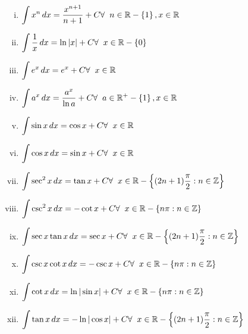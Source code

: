 \documentclass{article}
\begin{document}
\begin{enumerate}[i.]
    \item $\displaystyle\int x^n \, dx=\dfrac{x^{n+1}}{n+1} +C \hfill \forall \hspace{2mm} n \in \mathbb{R}-\left\{1\right\}, x \in \mathbb{R}$
    \item $\displaystyle\int \dfrac{1}{x} \, dx=\ln \abs{x} +C \hfill \forall \hspace{2mm} x \in \mathbb{R}- \left\{0\right\}$
    \item $\displaystyle\int e^x \, dx=e^x +C \hfill \forall \hspace{2mm} x \in \mathbb{R}$
    \item $\displaystyle\int a^x \, dx=\dfrac{a^x}{\ln a} +C \hfill \forall \hspace{2mm} a \in \mathbb{R}^+-\left\{1\right\}, x \in \mathbb{R}$
    \item $\displaystyle\int \sin x \, dx=\cos x +C \hfill \forall \hspace{2mm} x \in \mathbb{R}$
    \item $\displaystyle\int \cos x \, dx=\sin x +C \hfill \forall \hspace{2mm} x \in \mathbb{R}$
    \item $\displaystyle\int \sec^2 x \, dx=\tan x +C \hfill \forall \hspace{2mm} x \in \mathbb{R}-\left\{(2n+1)\dfrac{\pi}{2}:n \in \mathbb{Z}\right\}$
    \item $\displaystyle\int \csc^2 x \, dx=-\cot x +C \hfill \forall \hspace{2mm} x \in \mathbb{R}-\left\{n\pi:n \in \mathbb{Z}\right\}$
    \item $\displaystyle\int \sec x \tan x \, dx=\sec x +C \hfill \forall \hspace{2mm} x \in \mathbb{R}-\left\{(2n+1)\dfrac{\pi}{2}:n \in \mathbb{Z}\right\}$
    \item $\displaystyle\int \csc x \cot x \, dx=-\csc x +C \hfill \forall \hspace{2mm} x \in \mathbb{R}-\left\{n\pi:n\in \mathbb{Z}\right\}$
    \item $\displaystyle\int \cot x \, dx=\ln |\sin x| +C \hfill \forall \hspace{2mm} x \in \mathbb{R}-\left\{n\pi:n\in \mathbb{Z}\right\}$
    \item $\displaystyle\int \tan x \, dx=-\ln |\cos x| +C \hfill \forall \hspace{2mm} x \in \mathbb{R}-\left\{(2n+1)\dfrac{\pi}{2}:n\in \mathbb{Z}\right\}$

\end{enumerate}
\end{document}
